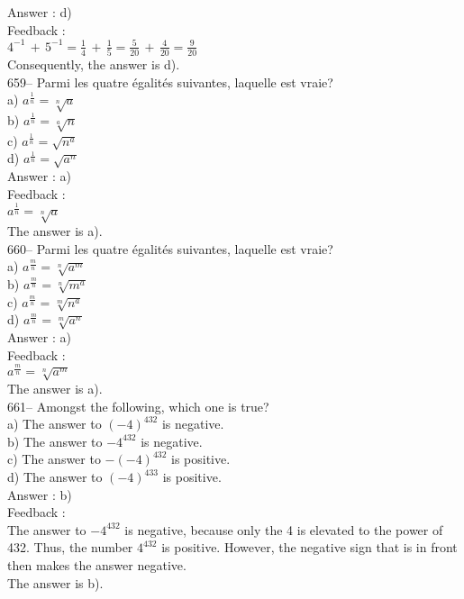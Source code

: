 \documentclass[letterpaper, 12pt]{article}
\begin{document}
Answer : d)\\

Feedback : \\[2mm]
$4^{-1}\,+\,5^{-1}=\frac{1}{4}\,+\,\frac{1}{5}=\frac{5}{20}\,+\,\frac{4}{20}=\frac{9}{20}$\\[2mm]
Consequently, the answer is d).\\

659-- Parmi les quatre \'egalit\'es suivantes, laquelle est vraie?\\
a) $a^{\frac{1}{n}}=\sqrt[n]{a}$\\[2mm]
b) $a^{\frac{1}{n}}=\sqrt[a]{n}$\\[2mm]
c) $a^{\frac{1}{n}}=\sqrt{n^{a}}$\\[2mm]
d) $a^{\frac{1}{n}}=\sqrt{a^{n}}$\\

Answer : a)\\

Feedback : \\
$a^{\frac{1}{n}}=\sqrt[n]{a}$\\
The answer is a).\\

660-- Parmi les quatre \'egalit\'es suivantes, laquelle est vraie?\\
a) $a^{\frac{m}{n}}=\sqrt[n]{a^{m}}$\\[2mm]
b) $a^{\frac{m}{n}}=\sqrt[n]{m^{a}}$\\[2mm]
c) $a^{\frac{m}{n}}=\sqrt[m]{n^{a}}$\\[2mm]
d) $a^{\frac{m}{n}}=\sqrt[m]{a^{n}}$\\

Answer : a)\\

Feedback : \\
$a^{\frac{m}{n}}=\sqrt[n]{a^{m}}$\\
The answer is a).\\

661-- Amongst the following, which one is true?\\
a) The answer to $(-4)^{432}$ is negative.\\
b) The answer to $-4^{432}$ is negative.\\
c) The answer to $-(-4)^{432}$ is positive.\\
d) The answer to $(-4)^{433}$ is positive.\\

Answer : b)\\

Feedback : \\
The answer to $-4^{432}$ is negative, because only the 4
 is elevated to the power of 432. Thus, the number $4^{432}$
is positive. However, the negative sign that is in front then makes the answer negative.\\
The answer is b).\\
\end{document}
